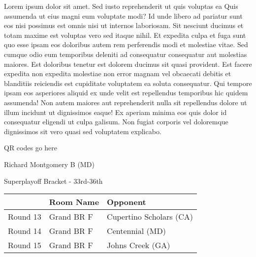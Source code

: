 \documentclass{article}%
\begin{document}
\vspace*{8pt}%
\linebreak%
\newline%
\newline%
Lorem ipsum dolor sit amet. Sed iusto reprehenderit ut quis voluptas ea Quis assumenda ut eius magni eum voluptate modi? Id unde libero ad pariatur sunt eos nisi possimus est omnis nisi ut internos laboriosam. Sit nesciunt ducimus et totam maxime est voluptas vero sed itaque nihil. Et expedita culpa et fuga sunt quo esse ipsam eos doloribus autem rem perferendis modi et molestiae vitae.\newline%
\newline%
Sed cumque odio eum temporibus deleniti ad consequatur consequatur aut molestias maiores. Est doloribus tenetur est dolorem ducimus sit quasi provident. Est facere expedita non expedita molestiae non error magnam vel obcaecati debitis et blanditiis reiciendis est cupiditate voluptatem ea soluta consequatur. Qui tempore ipsam eos asperiores aliquid ex unde velit est repellendus temporibus hic quidem assumenda!\newline%
\newline%
Non autem maiores aut reprehenderit nulla sit repellendus dolore ut illum incidunt ut dignissimos eaque! Ex aperiam minima eos quis dolor id consequatur eligendi ut culpa galisum. Non fugiat corporis vel doloremque dignissimos sit vero quasi sed voluptatem explicabo.\newline%
\newline%
%
\vspace*{30pt}%
\begin{center}%
\begin{Huge}%
QR codes go here%
\end{Huge}%
\end{center}%
\newpage%
\begin{center}%
\begin{Huge}%
Richard Montgomery B (MD)%
\end{Huge}%
\vspace*{8pt}%
\linebreak%
\begin{Large}%
Superplayoff Bracket {-} 33rd{-}36th%
\end{Large}%
\end{center}%
%
\begin{tabularx}{\textwidth}{|c|Y|Y|}%
\hline%
&Room Name&Opponent\\%
\hline%
Round 13&Grand BR F&Cupertino Scholars (CA)\\%
Round 14&Grand BR F&Centennial (MD)\\%
Round 15&Grand BR F&Johns Creek (GA)\\%
\hline%
\end{tabularx}%
\end{document}
